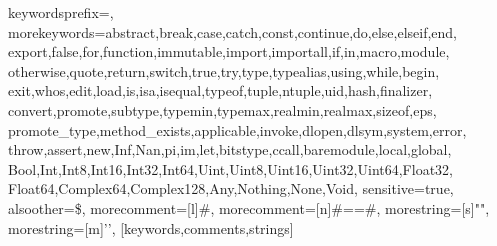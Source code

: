 {
	keywordsprefix=\@,
	morekeywords={abstract,break,case,catch,const,continue,do,else,elseif,end,
			export,false,for,function,immutable,import,importall,if,in,macro,module,
			otherwise,quote,return,switch,true,try,type,typealias,using,while,begin,
			exit,whos,edit,load,is,isa,isequal,typeof,tuple,ntuple,uid,hash,finalizer,
			convert,promote,subtype,typemin,typemax,realmin,realmax,sizeof,eps,
			promote_type,method_exists,applicable,invoke,dlopen,dlsym,system,error,
			throw,assert,new,Inf,Nan,pi,im,let,bitstype,ccall,baremodule,local,global,
			Bool,Int,Int8,Int16,Int32,Int64,Uint,Uint8,Uint16,Uint32,Uint64,Float32,
			Float64,Complex64,Complex128,Any,Nothing,None,Void},
	sensitive=true,
	alsoother={\$},
	morecomment=[l]\#,
	morecomment=[n]{\#=}{=\#},
	morestring=[s]{"}{"},
	morestring=[m]{'}{'},
}[keywords,comments,strings]

